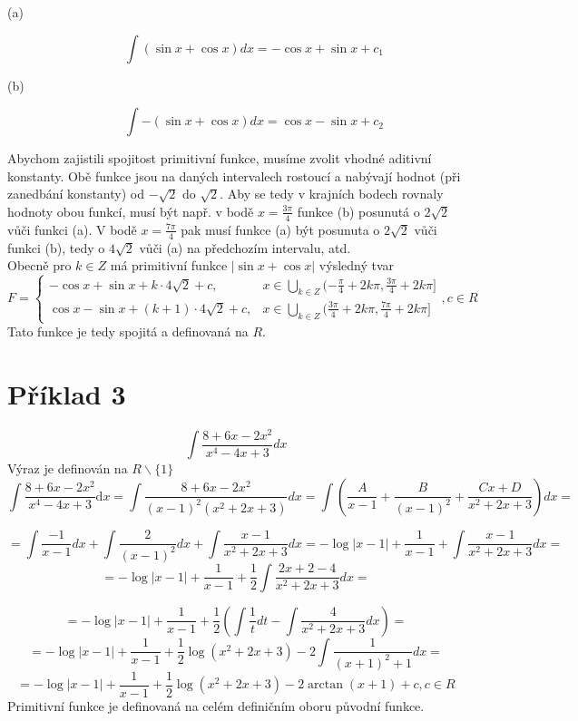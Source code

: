 \documentclass{scrreprt}
\begin{document}
\begin{description}
\item[(a)]
$$
\int \left( \sin x + \cos x \right) dx = -\cos x + \sin x + c_1
$$
\item[(b)]
$$
\int -\left( \sin x + \cos x \right) dx = \cos x - \sin x + c_2
$$
\end{description}
Abychom zajistili spojitost primitivní funkce, musíme zvolit vhodné aditivní konstanty. Obě funkce jsou na daných intervalech rostoucí a nabývají hodnot (při zanedbání konstanty) od $-\sqrt{2}$ do $\sqrt{2}$. Aby se tedy v krajních bodech rovnaly hodnoty obou funkcí, musí být např. v bodě $x=\frac{3\pi}{4}$ funkce (b) posunutá o $2\sqrt{2}$ vůči funkci (a). V bodě $x=\frac{7\pi}{4}$ pak musí funkce (a) být posunuta o $2\sqrt{2}$ vůči funkci (b), tedy o $4\sqrt{2}$ vůči (a) na předchozím intervalu, atd.\\

Obecně pro $k \in Z$ má primitivní funkce $\vert \sin x + \cos x \vert$ výsledný tvar
\begin{equation*}
F = \begin{cases}
	-\cos x + \sin x + k\cdot 4\sqrt{2}+c, & x \in \bigcup_{k \in Z} (-\frac{\pi}{4}+2k\pi, \frac{3\pi}{4} + 2k\pi]\\
	\cos x - \sin x + (k+1)\cdot 4\sqrt{2} + c, & x \in \bigcup_{k \in Z} (\frac{3\pi}{4}+2k\pi, \frac{7\pi}{4} + 2k\pi]
	\end{cases}
	,c \in R
\end{equation*}
Tato funkce je tedy spojitá a definovaná na $R$. 

\section*{Příklad 3}
$$
\int \frac{8+6x-2x^2}{x^4-4x+3} dx 
$$
Výraz je definován na $R \backslash \{1\}$
$$
\int \frac{8+6x-2x^2}{x^4-4x+3} \text{d}x = \int \frac{8+6x-2x^2}{(x-1)^2(x^2+2x+3)} dx 
= \int \left(\frac{A}{x-1} + \frac{B}{(x-1)^2} + \frac{Cx+D}{x^2+2x+3} \right) dx =
$$
\begin{flushright}
[$A = -1$, $B = 2$, $C = 1$, $D = -1$]
\end{flushright}
$$
= \int \frac{-1}{x-1} dx + \int \frac{2}{(x-1)^2} dx + \int \frac{x-1}{x^2+2x+3} dx 
= -\log \vert x-1 \vert + \frac{1}{x-1} + \int \frac{x-1}{x^2+2x+3} dx =
$$
$$
= -\log \vert x-1 \vert + \frac{1}{x-1} + \frac{1}{2} \int \frac{2x+2-4}{x^2+2x+3}dx= 
$$
\begin{flushright}
[substituce (1): $t = x^2+2x+3$, $dt = 2x+2$]
\end{flushright}
$$
= -\log \vert x-1 \vert + \frac{1}{x-1} + \frac{1}{2} \left( \int \frac{1}{t} dt - \int\frac{4}{x^2+2x+3} dx \right) =
$$
$$
= -\log \vert x-1 \vert + \frac{1}{x-1} + \frac{1}{2} \log (x^2+2x+3) - 2 \int \frac{1}{(x+1)^2+1} dx =
$$
$$
= -\log \vert x-1 \vert + \frac{1}{x-1} + \frac{1}{2} \log (x^2+2x+3) - 2 \arctan(x+1) + c, c \in R
$$
Primitivní funkce je definovaná na celém definičním oboru původní funkce.
\end{document}
